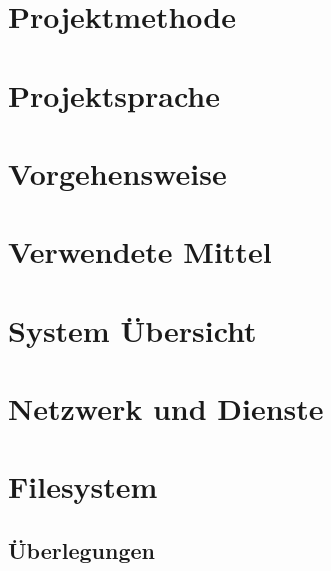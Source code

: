 \section{Projektmethode}

\section{Projektsprache}

\section{Vorgehensweise}

\section{Verwendete Mittel}

\section{System Übersicht}

\section{Netzwerk und Dienste}

\section{Filesystem}

\subsection{Überlegungen}
